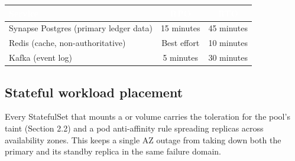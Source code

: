 \begin{center}
\begin{tabularx}{\linewidth}{@{}L c c@{}}
\toprule
{}
\textcolor{white}{\textbf{Service}} & \textcolor{white}{\textbf{RPO}} & \textcolor{white}{\textbf{RTO}} \\
\midrule
Synapse Postgres (primary ledger data) & 15 minutes & 45 minutes \\
Redis (cache, non-authoritative) & Best effort & 10 minutes \\
Kafka (event log) & 5 minutes & 30 minutes \\
\bottomrule
\end{tabularx}
\end{center}

\subsection{Stateful workload placement}
Every StatefulSet that mounts a  or  volume carries the  toleration for the  pool's taint (Section 2.2) and a pod anti-affinity rule spreading replicas across availability zones. This keeps a single AZ outage from taking down both the primary and its standby replica in the same failure domain.
